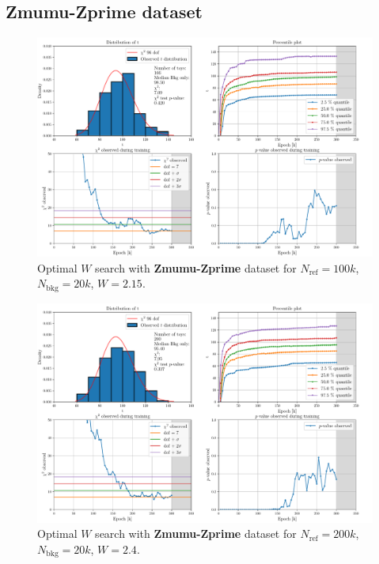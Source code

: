 \subsection*{Zmumu-Zprime dataset}
\vspace{-5mm}
\begin{figure}[H]
	\centering
	\includegraphics[width=1.0\textwidth]{Python/W_CLIP/ref100000_bkg20000_sig0/data_ref100000_bkg20000_sig0_wclip2-15.pdf}
	\caption{Optimal $W$ search with \textbf{Zmumu-Zprime} dataset for $N_\mathrm{ref}=100\si{k}$, $N_\mathrm{bkg}=20\si{k}$, $W=2.15$.}
	\label{fig:REF100000_BKG20000_SIG0_WCLIP2.15}
\end{figure}
\vspace{-5mm}
\begin{figure}[H]
	\centering
	\includegraphics[width=1.0\textwidth]{Python/W_CLIP/ref200000_bkg20000_sig0/data_ref200000_bkg20000_sig0_wclip2-4.pdf}
	\caption{Optimal $W$ search with \textbf{Zmumu-Zprime} dataset for $N_\mathrm{ref}=200\si{k}$, $N_\mathrm{bkg}=20\si{k}$, $W=2.4$.}
	\label{fig:REF200000_BKG20000_SIG0_WCLIP2.4}
\end{figure}
